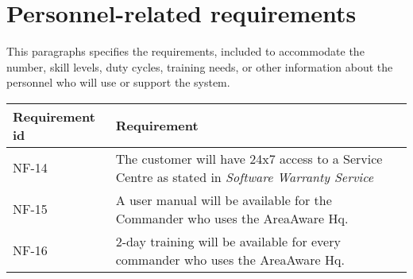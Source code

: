 \section{Personnel-related requirements}
This paragraphs specifies the requirements, included to accommodate the number, skill levels, duty cycles, training needs, or other information about the personnel who will use or support the system.


\begin{longtable}{| p{3.2cm} |  p{10cm} | }
	\hline
	\textbf{Requirement id} &  \textbf{Requirement } \\
	\hline
	NF-14 &The customer will have 24x7 access to a Service Centre as stated in \emph{Software Warranty Service}  \\
	\hline
	NF-15 & A user manual will be available for the Commander who uses the AreaAware Hq. \\
	\hline
	NF-16 & 2-day training will be available for every commander who uses the AreaAware Hq. \\
	\hline
\end{longtable}




